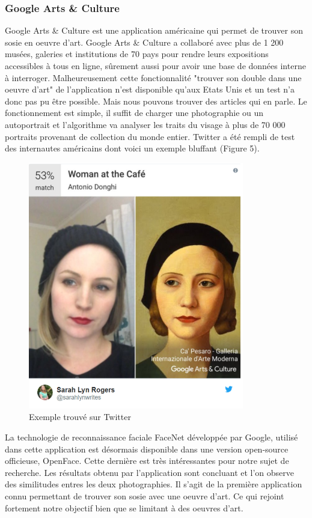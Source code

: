 \documentclass[a4paper,12pt]{article}
\begin{document}
\subsubsection{Google Arts \& Culture}
Google Arts \& Culture est une application américaine qui permet de trouver son sosie en oeuvre d’art. Google Arts \& Culture a collaboré avec plus de 1 200 musées, galeries et institutions de 70 pays pour rendre leurs expositions accessibles à tous en ligne, sûrement aussi pour avoir une base de données interne à interroger. Malheureusement cette fonctionnalité "trouver son double dans une oeuvre d'art" de l'application n'est disponible qu'aux Etats Unis et un test n'a donc pas pu être possible. Mais nous pouvons trouver des articles qui en parle. Le fonctionnement est simple, il suffit de charger une photographie ou un autoportrait et l'algorithme va analyser les traits du visage à plus de 70 000 portraits provenant de collection du monde entier. Twitter a été rempli de test des internautes américains dont voici un exemple bluffant (Figure 5).
\begin{figure}[!ht]
    \centering
        \includegraphics[scale=1]{images/GAC.PNG}
        \caption{Exemple trouvé sur Twitter}
    \end{figure}

La technologie de reconnaissance faciale FaceNet développée par Google, utilisé dans cette application est désormais disponible dans une version open-source officieuse, OpenFace. Cette dernière est très intéressantes pour notre sujet de recherche. Les résultats obtenu par l'application sont concluant et l'on observe des similitudes entres les deux photographies. Il s'agit de la première application connu permettant de trouver son sosie avec une oeuvre d'art. Ce qui rejoint fortement notre objectif bien que se limitant à des oeuvres d'art.  
\end{document}
